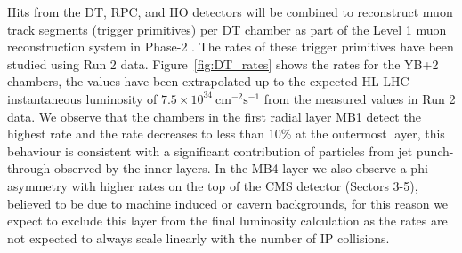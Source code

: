 Hits from the DT, RPC, and HO detectors will be combined to reconstruct muon track segments (trigger primitives)
per DT chamber as part of the  Level 1 muon reconstruction system in Phase-2 \cite{CERN-LHCC-2017-012}.
The rates of these trigger primitives have been studied using Run 2 data.
Figure~\ref{fig:DT_rates} shows the rates for the YB+2  chambers,
the values have been extrapolated up to the expected HL-LHC instantaneous luminosity
of  $7.5\times10^{34}\ \text{cm}^{-2}\text{s}^{-1}$ from the measured values in Run 2 data.
We observe that the chambers in the first radial layer MB1 detect the highest rate
and the rate decreases to less than 10\% at the outermost layer,
this behaviour is consistent with a significant contribution of particles from jet punch-through observed by the inner layers.
In the MB4 layer we also observe a phi asymmetry with higher rates on the top of the CMS detector (Sectors 3-5),
believed to be due to machine induced or cavern backgrounds,
for this reason we expect to exclude this layer from the final luminosity calculation as the rates are not expected to always scale linearly with the number of IP collisions. 




